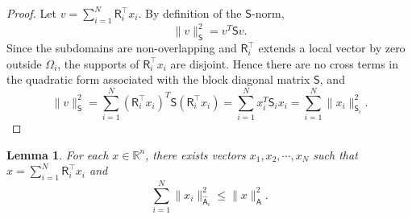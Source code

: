 \documentclass[preprint,12pt]{elsarticle}
\newtheorem{lemma}[theorem]{Lemma} %
\begin{document}
  \begin{proof}
    Let $v = \sum_{i=1}^{N}\mathsf{R}_{i}^{\intercal}x_{i}$. By definition of
    the $\mathsf{S}$-norm,
    \[
      \|v\|_{\mathsf{S}}^{2}= v^{T}\mathsf{S}v.
    \]
    Since the subdomains are non-overlapping and $\mathsf{R}_{i}^{\intercal}$ extends
    a local vector by zero outside $\Omega_{i}$, the supports of
    $\mathsf{R}_{i}^{\intercal}x_{i}$ are disjoint. Hence there are no cross terms
    in the quadratic form associated with the block diagonal matrix $\mathsf{S}$,
    and
    \[
      \|v\|_{\mathsf{S}}^{2}= \sum_{i=1}^{N}(\mathsf{R}_{i}^{\intercal}x_{i})^{T}
      \mathsf{S}(\mathsf{R}_{i}^{\intercal}x_{i}) = \sum_{i=1}^{N}x_{i}^{T}\mathsf{S}
      _{i}x_{i}= \sum_{i=1}^{N}\|x_{i}\|_{\mathsf{S}_{i}}^{2}.
    \]
  \end{proof}

  \begin{lemma}
    For each $x\in \mathbb{R}^{n}$, there exists vectors
    $x_{1}, x_{2}, \cdots, x_{N}$ such that
    $x = \sum_{i=1}^{N}\mathsf{R}_{i}^{\intercal}x_{i}$ and
    \[
      \sum_{i=1}^{N}\|x_{i}\|_{\widehat{\mathsf{A}}_{i}}^{2}\leq \|x\|_{\mathsf{A}}
      ^{2}.
    \]
  \end{lemma}
\end{document}
